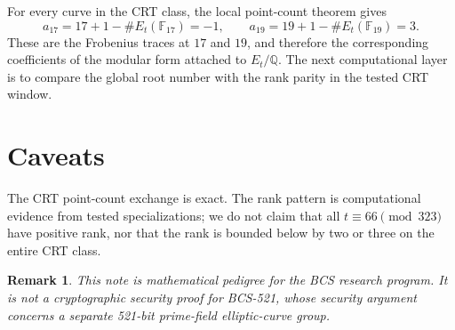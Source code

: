 \documentclass[11pt]{article}
\newtheorem{remark}{Remark}
\newcommand{\Q}{\mathbb{Q}}
\newcommand{\F}{\mathbb{F}}
\begin{document}
For every curve in the CRT class, the local point-count theorem gives
\[
a_{17}=17+1-\#E_t(\F_{17})=-1,\qquad
a_{19}=19+1-\#E_t(\F_{19})=3.
\]
These are the Frobenius traces at \(17\) and \(19\), and therefore the
corresponding coefficients of the modular form attached to \(E_t/\Q\).
The next computational layer is to compare the global root number with the
rank parity in the tested CRT window.

\section{Caveats}

The CRT point-count exchange is exact. The rank pattern is computational
evidence from tested specializations; we do not claim that all
\(t\equiv 66\pmod{323}\) have positive rank, nor that the rank is bounded
below by two or three on the entire CRT class.

\begin{remark}
This note is mathematical pedigree for the BCS research program. It is not a
cryptographic security proof for BCS-521, whose security argument concerns a
separate 521-bit prime-field elliptic-curve group.
\end{remark}
\end{document}
